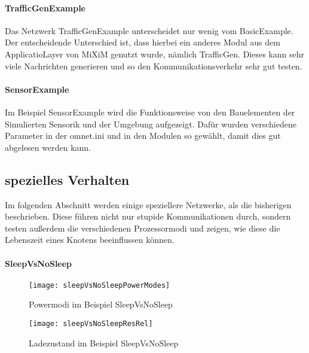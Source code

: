 \paragraph{TrafficGenExample}

Das Netzwerk TrafficGenExample unterscheidet nur wenig vom BasicExample. Der entscheidende Unterschied ist, dass hierbei ein anderes Modul aus dem ApplicatioLayer von MiXiM genutzt wurde, nämlich TrafficGen. Dieses kann sehr viele Nachrichten generieren und so den Kommunikationsverkehr sehr gut testen.

\paragraph{SensorExample}

Im Beispiel SensorExample wird die Funktionsweise von den Bauelementen der Simulierten Sensorik und der Umgebung aufgezeigt. Dafür wurden verschiedene Parameter in der omnet.ini und in den Modulen so gewählt, damit dies gut abgelesen werden kann.



\subsection*{spezielles Verhalten}

Im folgenden Abschnitt werden einige speziellere Netzwerke, als die bisherigen beschrieben. Diese führen nicht nur stupide Kommunikationen durch, sondern testen außerdem die verschiedenen Prozessormodi und zeigen, wie diese die Lebenszeit eines Knotens beeinflussen können.

\paragraph{SleepVsNoSleep}

\begin{figure}[htbp]
\centering
\caption{Powermodi im Beispiel SleepVsNoSleep}
\label{fig:sleepVsNoSleepPowerModes}
\texttt{[image: sleepVsNoSleepPowerModes]}
\end{figure}

\begin{figure}[htbp]
\centering
\caption{Ladezustand im Beispiel SleepVsNoSleep}
\label{fig:sleepVsNoSleepResRel}
\texttt{[image: sleepVsNoSleepResRel]}
\end{figure}

